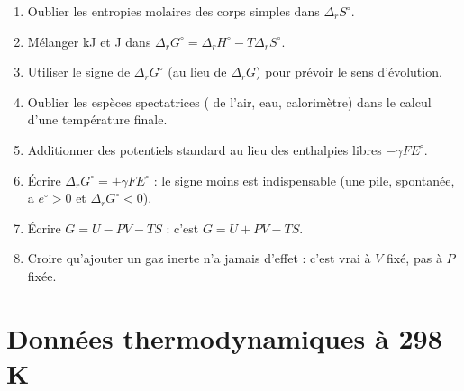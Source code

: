 \begin{pieges}
\begin{enumerate}[leftmargin=1.8em]
  \item Oublier les entropies molaires des corps simples dans $\Delta_rS^\circ$.
  \item Mélanger kJ et J dans $\Delta_rG^\circ = \Delta_rH^\circ - T\Delta_rS^\circ$.
  \item Utiliser le signe de $\Delta_rG^\circ$ (au lieu de $\Delta_rG$) pour prévoir le sens d'évolution.
  \item Oublier les espèces spectatrices ( de l'air, eau, calorimètre) dans le calcul d'une température finale.
  \item Additionner des potentiels standard au lieu des enthalpies libres $-\gamma FE^\circ$.
  \item Écrire $\Delta_rG^\circ = +\gamma FE^\circ$ : le signe moins est indispensable (une pile, spontanée, a $e^\circ > 0$ et $\Delta_rG^\circ<0$).
  \item Écrire $G = U - PV - TS$ : c'est $G = U + PV - TS$.
  \item Croire qu'ajouter un gaz inerte n'a jamais d'effet : c'est vrai à $V$ fixé, pas à $P$ fixée.
\end{enumerate}
\end{pieges}

\section*{Données thermodynamiques à 298 K}

